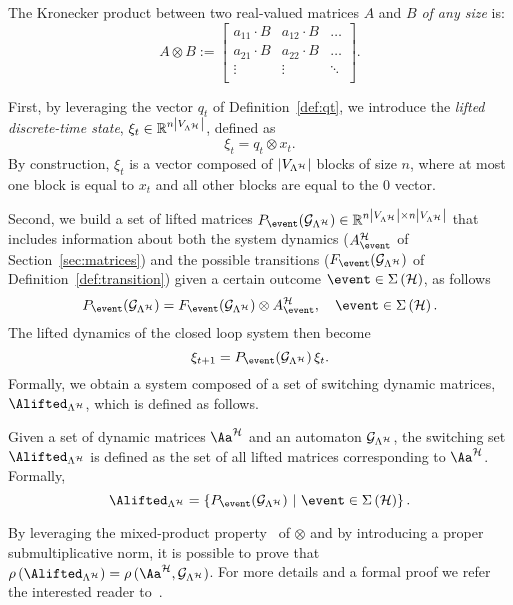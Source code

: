 \begin{definition}%
    The Kronecker product between two real-valued matrices $A$ and $B$ \emph{of any size} is:%
    \begin{equation*}
        A \otimes B :=
        \begin{bmatrix}
            a_{11}\cdot B   & a_{12}\cdot B & \hdots \\
            a_{21}\cdot B   & a_{22}\cdot B & \hdots \\
            \vdots          & \vdots        & \ddots\\
      \end{bmatrix}.
    \end{equation*}
\end{definition}
%

First, by leveraging the vector $q_t$ of Definition~\ref{def:qt}, we introduce the \emph{lifted discrete-time state}, $\xi_t\in\mathbb{R}^{n\left|V_{\Lambda^{\mathcal{H}}}\right|}$, defined as 
$$\xi_t = q_t\otimes x_t.$$
By construction, $\xi_t$ is a vector composed of $\left|V_{\Lambda^{\mathcal{H}}}\right|$ blocks of size $n$, where at most one block is equal to $x_t$ and all other blocks are equal to the $0$ vector.

Second, we build a set of lifted matrices $P_{\event} ( \GG{\Lambda^\strat} )\in\mathbb{R}^{n\abs{\VV{\Lambda^\strat}}\times n\abs{\VV{\Lambda^\strat}}}$ that includes information about both the system dynamics ($A^\strat_\event$ of Section~\ref{sec:matrices}) and the possible transitions ($F_{\event} ( \GG{\Lambda^\strat} )$ of Definition~\ref{def:transition}) given a certain outcome $\event\in\Sigma\left(\strat\right)$, as follows
%
\begin{equation}
    \label{eq:lifted_matrix}
    P_{\event} ( \GG{\Lambda^\strat} ) = F_{\event} ( \GG{\Lambda^\strat} )\otimes A_\event^\strat,\quad \event \in \Sigma \left( \strat \right).
\end{equation}
%
The lifted dynamics of the closed loop system then become%
%
$$
    \xi_{t+1} = P_{\event} ( \GG{\Lambda^\strat} )\,\xi_t.
$$
%
Formally, we obtain a system composed of a set of switching dynamic matrices, $\Alifted_{\Lambda^\strat}$, which is defined as follows.
%
\begin{definition}%
    \label{def:switching_set}%
    Given a set of dynamic matrices $\Aa^{\strat}$ and an automaton $\mathcal{G}_{\Lambda^{\mathcal{H}}}$, the switching set $\Alifted_{\Lambda^\strat}$ is defined as the set of all lifted matrices corresponding to $\Aa^{\strat}$.
    Formally,
    $$
    \Alifted_{\Lambda^\strat} = \left\{ P_{\event} ( \GG{\Lambda^\strat} ) \,\, | \,\, \event \in \Sigma\left(\strat\right) \right\}.
    $$
    \end{definition}
%
By leveraging the mixed-product property~\cite{horn2012matrix} of $\otimes$ and by introducing a proper submultiplicative norm, it is possible to prove that $\rho\left(\Alifted_{\Lambda^\strat}\right)= \rho\,(\Aa^{\strat},\GG{\Lambda^\strat})$.
For more details and a formal proof we refer the interested reader to~\cite{xu2020approximation}.

